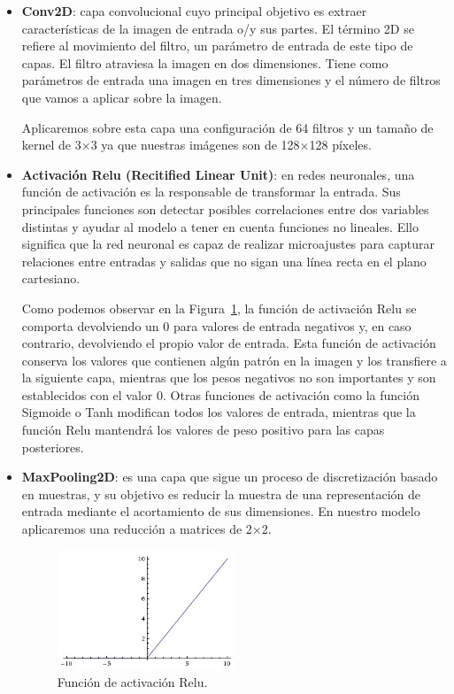 \begin{itemize}
    \item \textbf{Conv2D}: capa convolucional cuyo principal objetivo es extraer características de la imagen de entrada o/y sus partes.
    El término 2D se refiere al movimiento del filtro, un parámetro de entrada de este tipo de capas.
    El filtro atraviesa la imagen en dos dimensiones.
    Tiene como parámetros de entrada una imagen en tres dimensiones y el número de filtros que vamos a aplicar sobre la imagen.

    Aplicaremos sobre esta capa una configuración de 64 filtros y un tamaño de kernel de 3$\times$3 ya que nuestras imágenes son de 128$\times$128 píxeles.

    \item \textbf{Activación Relu (Recitified Linear Unit)}: en redes neuronales, una función de activación es la responsable de transformar la entrada.
    Sus principales funciones son detectar posibles correlaciones entre dos variables distintas y ayudar al modelo a tener en cuenta funciones no lineales. Ello significa que la red neuronal es capaz de realizar microajustes para capturar relaciones entre entradas y salidas que no sigan una línea recta en el plano cartesiano.

    Como podemos observar en la Figura~\ref{fig:Función de activación Relu}, la función de activación Relu se comporta devolviendo un 0 para valores de entrada negativos y, en caso contrario, devolviendo el propio valor de entrada.
    Esta función de activación conserva los valores que contienen algún patrón en la imagen y los transfiere a la siguiente capa, mientras que los pesos negativos no son importantes y son establecidos con el valor 0.
    Otras funciones de activación como la función Sigmoide o Tanh modifican todos los valores de entrada, mientras que la función Relu mantendrá los valores de peso positivo para las capas posteriores.

    \item \textbf{MaxPooling2D}: es una capa que sigue un proceso de discretización basado en muestras, y su objetivo es reducir la muestra de una representación de entrada mediante el acortamiento de sus dimensiones.
    En nuestro modelo aplicaremos una reducción a matrices de 2$\times$2.

    \begin{figure}
        \centering
        \includegraphics[width=0.5\textwidth]{images/chapter2/relu.jpg}
        \caption{Función de activación Relu.}
        \label{fig:Función de activación Relu}
    \end{figure}


\end{itemize}
